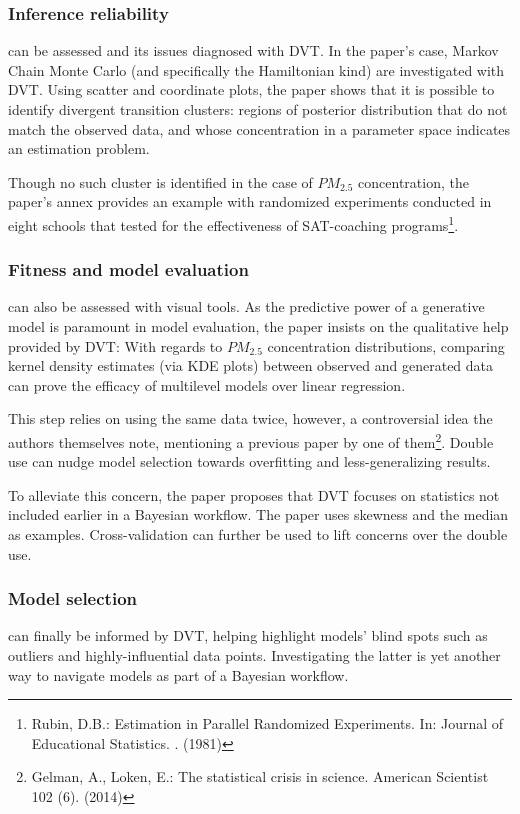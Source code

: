 \documentclass[runningheads]{llncs}
\begin{document}
\subsubsection{Inference reliability} can be assessed and its issues diagnosed with DVT. In the paper's case, Markov Chain Monte Carlo (and specifically the Hamiltonian kind) are investigated with DVT. Using scatter and coordinate plots, the paper shows that it is possible to identify divergent transition clusters: regions of posterior distribution that do not match the observed data, and whose concentration in a parameter space indicates an estimation problem. 

Though no such cluster is identified in the case of $PM_{2.5}$ concentration, the paper's annex provides an example with randomized experiments conducted in eight schools that tested for the effectiveness of SAT-coaching programs\footnote{Rubin, D.B.: Estimation in Parallel Randomized Experiments. In: Journal of Educational Statistics. . (1981)}.
   
\subsubsection{Fitness and model evaluation} can also be assessed with visual tools. As the predictive power of a generative model is paramount in model evaluation, the paper insists on the qualitative help provided by DVT: With regards to $PM_{2.5}$ concentration distributions, comparing kernel density estimates (via KDE plots) between observed and generated data can prove the efficacy of multilevel models over linear regression.

This step relies on using the same data twice, however, a controversial idea the authors themselves note, mentioning a previous paper by one of them\footnote{Gelman, A., Loken, E.: The statistical crisis in science. American Scientist 102 (6). (2014)}. Double use can nudge model selection towards overfitting and less-generalizing results. 

To alleviate this concern, the paper proposes that DVT focuses on statistics not included earlier in a Bayesian workflow. The paper uses skewness and the median as examples. Cross-validation can further be used to lift concerns over the double use.

\subsubsection{Model selection} can finally be informed by DVT, helping highlight models' blind spots such as outliers and highly-influential data points. Investigating the latter is yet another way to navigate models as part of a Bayesian workflow. 
\end{document}
